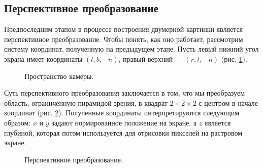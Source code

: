 \documentclass{article}
\begin{document}
\subsection{Перспективное преобразование}

Предпоследним этапом в процессе построения двумерной картинки является перспективное преобразование.
Чтобы понять, как оно работает, рассмотрим систему координат, полученную на предыдущем этапе.
Пусть левый нижний угол экрана имеет координаты $(l, b, -n)$, правый верхний --- $(r, t, -n)$ (рис. \ref{camera space}).

\begin{figure}[ht]
    \caption{Пространство камеры.}
    \label{camera space}
\end{figure}

Суть перспективного преобразования заключается в том, что мы преобразуем область, ограниченную пирамидой зрения, в квадрат $2 \times 2 \times 2$ с центром в начале координат (рис. \ref{perspective projection}).
Полученные координаты интерпретируются следующим образом: $x$ и $y$ задают нормированное положение на экране, а $z$ является глубиной, которая потом используется для отрисовки пикселей на растровом экране.

\begin{figure}[ht]
    \caption{Перспективное преобразование.}
    \label{perspective projection}
\end{figure}
\end{document}
